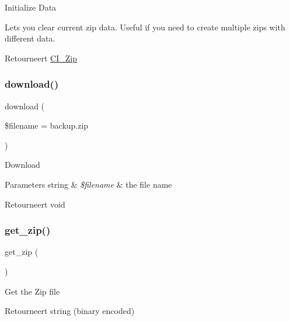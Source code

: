 Initialize Data

Lets you clear current zip data. Useful if you need to create multiple zips with different data.

\begin{DoxyReturn}{Retourneert}
\mbox{\hyperlink{class_c_i___zip}{C\+I\+\_\+\+Zip}} 
\end{DoxyReturn}
\mbox{\label{class_c_i___zip_ad4263f6c296942842ae25a94053c5f16}} 
\subsubsection{\texorpdfstring{download()}{download()}}
{\footnotesize\ttfamily download (\begin{DoxyParamCaption}\item[{}]{\$filename = {\ttfamily \textquotesingle{}backup.zip\textquotesingle{}} }\end{DoxyParamCaption})}

Download


\begin{DoxyParams}[1]{Parameters}
string & {\em \$filename} & the file name \\
\hline
\end{DoxyParams}
\begin{DoxyReturn}{Retourneert}
void 
\end{DoxyReturn}
\mbox{\label{class_c_i___zip_a263fd906f99ccca15a12fe34a79656e4}} 
\subsubsection{\texorpdfstring{get\_zip()}{get\_zip()}}
{\footnotesize\ttfamily get\+\_\+zip (\begin{DoxyParamCaption}{ }\end{DoxyParamCaption})}

Get the Zip file

\begin{DoxyReturn}{Retourneert}
string (binary encoded) 
\end{DoxyReturn}
\mbox{\label{class_c_i___zip_a296847a86d7cf0e4bba9b71a173cfffe}} 
